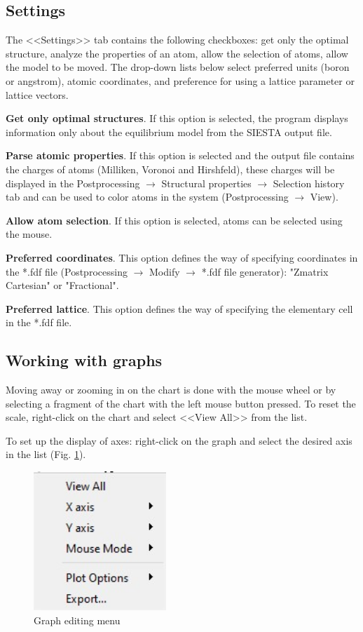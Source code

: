 \documentclass{article}
\begin{document}
\subsection{Settings \label{settingsmode}}

The <<Settings>> tab contains the following checkboxes: get only the optimal structure, analyze the properties of an atom, allow the selection of atoms, allow the model to be moved. The drop-down lists below select preferred units (boron or angstrom), atomic coordinates, and preference for using a lattice parameter or lattice vectors.


\textbf{Get only optimal structures}. If this option is selected, the program displays information only about the equilibrium model from the SIESTA output file.


\textbf{Parse atomic properties}. If this option is selected and the output file contains the charges of atoms (Milliken, Voronoi and Hirshfeld), these charges will be displayed in the Postprocessing $\to$ Structural properties $\to$ Selection history tab and can be used to color atoms in the system (Postprocessing $\to$ View).


\textbf{Allow atom selection}. If this option is selected, atoms can be selected using the mouse.


\textbf{Preferred coordinates}. This option defines the way of specifying coordinates in the *.fdf file (Postprocessing $\to$ Modify $\to$ *.fdf file generator): "Zmatrix Cartesian" or "Fractional".


\textbf{Preferred lattice}. This option defines the way of specifying the elementary cell in the *.fdf file.


\subsection{Working with graphs}

Moving away or zooming in on the chart is done with the mouse wheel or by selecting a fragment of the chart with the left mouse button pressed. To reset the scale, right-click on the chart and select <<View All>> from the list.

To set up the display of axes: right-click on the graph and select the desired axis in the list (Fig. \ref{fig:graph1}).


\begin{figure}[h!]
	\centering
	\includegraphics[width=5.0cm]{graph1}
	\caption{Graph editing menu}
	\label{fig:graph1}
\end{figure}
\end{document}
